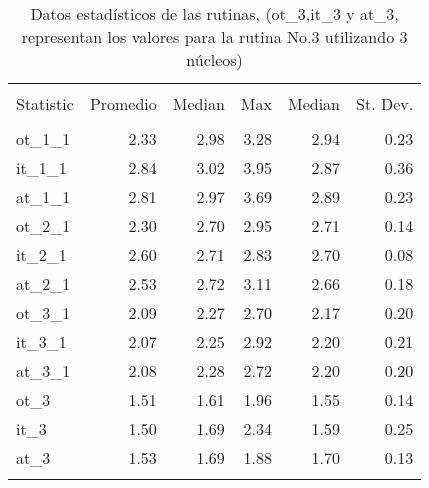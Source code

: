 \documentclass{article}
\begin{document}
\begin{table}[!htbp] \centering 
  \caption{Datos estadísticos de las rutinas, (ot\_3,it\_3 y at\_3, representan los valores para la rutina No.3 utilizando 3 núcleos)} 
  \label{estadistica} 
\begin{tabular}{@{\extracolsep{5pt}}lrrrrr} 
\\[-1.8ex]\hline 
\hline \\[-1.8ex] 
Statistic & \multicolumn{1}{r}{Promedio} & \multicolumn{1}{r}{Median} & \multicolumn{1}{r}{Max} & \multicolumn{1}{r}{Median} & \multicolumn{1}{r}{St. Dev.} \\ 
\hline \\[-1.8ex] 
ot\_1\_1 & 2.33 & 2.98 & 3.28 & 2.94 & 0.23 \\ 
it\_1\_1 & 2.84 & 3.02 & 3.95 & 2.87 & 0.36 \\ 
at\_1\_1 & 2.81 & 2.97 & 3.69 & 2.89 & 0.23 \\ 
ot\_2\_1 & 2.30 & 2.70 & 2.95 & 2.71 & 0.14 \\ 
it\_2\_1 & 2.60 & 2.71 & 2.83 & 2.70 & 0.08 \\ 
at\_2\_1 & 2.53 & 2.72 & 3.11 & 2.66 & 0.18 \\ 
ot\_3\_1 & 2.09 & 2.27 & 2.70 & 2.17 & 0.20 \\ 
it\_3\_1 & 2.07 & 2.25 & 2.92 & 2.20 & 0.21 \\ 
at\_3\_1 & 2.08 & 2.28 & 2.72 & 2.20 & 0.20 \\ 
ot\_3 & 1.51 & 1.61 & 1.96 & 1.55 & 0.14 \\ 
it\_3 & 1.50 & 1.69 & 2.34 & 1.59 & 0.25 \\ 
at\_3 & 1.53 & 1.69 & 1.88 & 1.70 & 0.13 \\ 

\hline \\[-1.8ex] 



\end{tabular} 
\end{table} 
\end{document}
